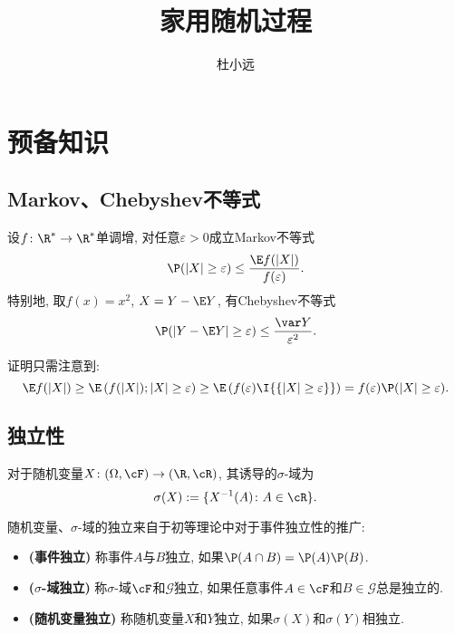 \documentclass[a4paper, 10pt]{ctexart}
\title{家用随机过程}
\author{杜小远}
\date{\zhtoday}
\begin{document}
\maketitle
{
	\footnotesize\keben\kebenE
	\tableofcontents
}

\section{预备知识}
\subsection{Markov、Chebyshev不等式}

\begin{theorem}
	设$f \colon \R^* \to \R^*$单调增, 对任意$\varepsilon > 0$成立Markov不等式
	\begin{equation}\label{eq:Markov'sInequality}
		\P(|X| \geq \varepsilon) \leq \frac{\E f(|X|)}{f(\varepsilon)}.
	\end{equation}
	特别地, 取$f(x) = x^2$, $X = Y - \E Y$, 有Chebyshev不等式
	\begin{equation*}
		\P(|Y - \E Y| \geq \varepsilon) \leq \frac{\var Y}{\varepsilon^2}.
	\end{equation*}
\end{theorem}
\noindent
证明只需注意到: 
\begin{equation*}
	\E f(|X|) 
		\geq \E \left(f(|X|); |X| \geq \varepsilon \right)
		\geq \E \left(f(\varepsilon) \I{\{|X| \geq \varepsilon\}} \right) 
		= f(\varepsilon) \P(|X| \geq \varepsilon).
\end{equation*}


\subsection{独立性}

\noindent
对于随机变量$X \colon (\Omega, \cF) \to (\R, \cR)$, 其诱导的$\sigma$-域为
\begin{equation*}
	\sigma(X) := \{ X^{-1}(A) \colon A \in \cR\}. 
\end{equation*}

随机变量、$\sigma$-域的独立来自于初等理论中对于事件独立性的推广: 
\begin{itemize}
	\item \textbf{(事件独立)} 称事件$A$与$B$独立, 如果$\P(A \cap B) = \P(A) \P(B)$.
	\item \textbf{($\sigma$-域独立)} 称$\sigma$-域$\cF$和$\mathcal G$独立, 如果任意事件$A \in \cF$和$B \in \mathcal G$总是独立的. 
	\item \textbf{(随机变量独立)} 称随机变量$X$和$Y$独立, 如果$\sigma(X)$和$\sigma(Y)$相独立. 
\end{itemize}
\end{document}
